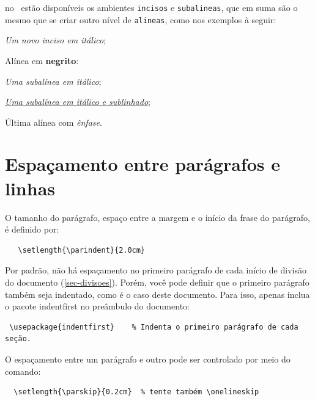 \begin{alineas}
  \item no \abnTeX\ estão disponíveis os ambientes \texttt{incisos} e
  \texttt{subalineas}, que em suma são o mesmo que se criar outro nível de
  \texttt{alineas}, como nos exemplos à seguir:
  
  \begin{incisos}
    \item \textit{Um novo inciso em itálico};
  \end{incisos}
  
  \item Alínea em \textbf{negrito}:
  
  \begin{subalineas}
    \item \textit{Uma subalínea em itálico};
    \item \underline{\textit{Uma subalínea em itálico e sublinhado}}; 
  \end{subalineas}
  
  \item Última alínea com \emph{ênfase}.
  
\end{alineas}

\section{Espaçamento entre parágrafos e linhas}

O tamanho do parágrafo, espaço entre a margem
e o início da frase do parágrafo, é definido por:
\begin{verbatim}
   \setlength{\parindent}{2.0cm}
\end{verbatim}

Por padrão, não há espaçamento no
primeiro parágrafo de cada início de divisão do documento
(\autoref{sec-divisoes}). Porém, você pode definir que o primeiro parágrafo
também seja indentado, como é o caso deste documento. Para isso, apenas inclua o
pacote \textsf{indentfirst} no preâmbulo do documento:
\begin{verbatim}
 \usepackage{indentfirst}    % Indenta o primeiro parágrafo de cada seção.
\end{verbatim}

O espaçamento entre um parágrafo e outro
pode ser controlado por meio do comando:
\begin{verbatim}
  \setlength{\parskip}{0.2cm}  % tente também \onelineskip
\end{verbatim}

